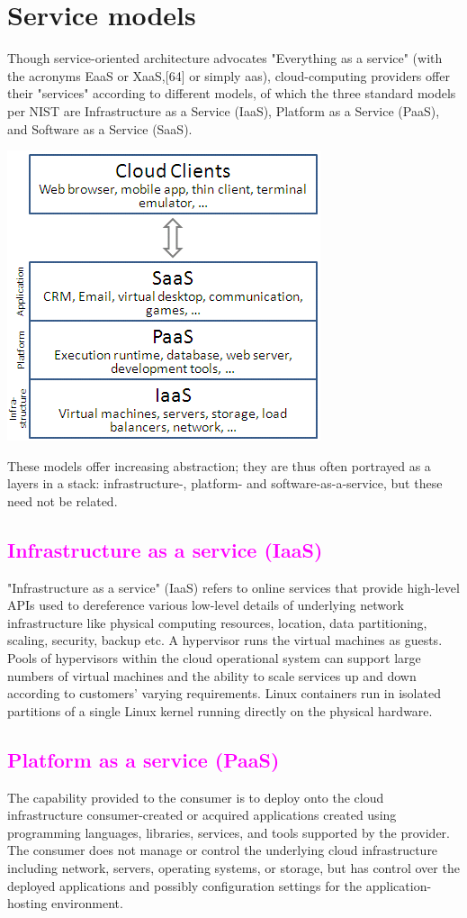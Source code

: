 \documentclass[11pt]{article}
\begin{document}
\section{\color{green}Service models}
Though service-oriented architecture advocates "Everything as a service" (with the acronyms EaaS or XaaS,[64] or simply aas), cloud-computing providers offer their "services" according to different models, of which the three standard models per NIST are Infrastructure as a Service (IaaS), Platform as a Service (PaaS), and Software as a Service (SaaS).
\begin{center}

\includegraphics[scale=0.5]{a2.png} 
\end{center}
These models offer increasing abstraction; they are thus often portrayed as a layers in a stack: infrastructure-, platform- and software-as-a-service, but these need not be related. 
\subsection{\textcolor{magenta}{Infrastructure as a service (IaaS)}}
"Infrastructure as a service" (IaaS) refers to online services that provide high-level APIs used to dereference various low-level details of underlying network infrastructure like physical computing resources, location, data partitioning, scaling, security, backup etc. A hypervisor runs the virtual machines as guests. Pools of hypervisors within the cloud operational system can support large numbers of virtual machines and the ability to scale services up and down according to customers' varying requirements. Linux containers run in isolated partitions of a single Linux kernel running directly on the physical hardware.
\subsection{\textcolor{magenta}{Platform as a service (PaaS)}}
The capability provided to the consumer is to deploy onto the cloud infrastructure consumer-created or acquired applications created using programming languages, libraries, services, and tools supported by the provider. The consumer does not manage or control the underlying cloud infrastructure including network, servers, operating systems, or storage, but has control over the deployed applications and possibly configuration settings for the application-hosting environment.
\end{document}
